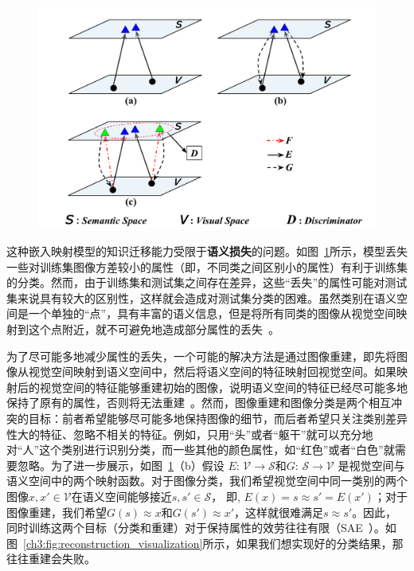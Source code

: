 \begin{figure}
    \centering
        \includegraphics[width=0.95\linewidth]{chapter3/res/zsl_paradigms.pdf}
    \label{ch3:fig:zsl_paradigms}
\end{figure}

这种嵌入映射模型的知识迁移能力受限于\textbf{语义损失}的问题。如图~\ref{ch3:fig:zsl_paradigms}所示，模型丢失一些对训练集图像方差较小的属性（即，不同类之间区别小的属性）有利于训练集的分类。然而，由于训练集和测试集之间存在差异，这些“丢失”的属性可能对测试集来说具有较大的区别性，这样就会造成对测试集分类的困难。虽然类别在语义空间是一个单独的“点”，具有丰富的语义信息，但是将所有同类的图像从视觉空间映射到这个点附近，就不可避免地造成部分属性的丢失~\cite{lazaridou2015hubness,fu2015transductive}。


为了尽可能多地减少属性的丢失，一个可能的解决方法是通过图像重建，即先将图像从视觉空间映射到语义空间中，然后将语义空间的特征映射回视觉空间。如果映射后的视觉空间的特征能够重建初始的图像，说明语义空间的特征已经尽可能多地保持了原有的属性，否则将无法重建~\cite{kim2017learning,yi2017dualgan,zhu2017unpaired,he2016dual}。然而，图像重建和图像分类是两个相互冲突的目标：前者希望能够尽可能多地保持图像的细节，而后者希望只关注类别差异性大的特征、忽略不相关的特征。例如，只用“头”或者“躯干”就可以充分地对“人”这个类别进行识别分类，而一些其他的颜色属性，如“红色”或者“白色”就需要忽略。为了进一步展示，如图~\ref{ch3:fig:zsl_paradigms}（b）假设 $E$: $\mathcal{V}\rightarrow \mathcal{S}$和$G$: $\mathcal{S}\rightarrow \mathcal{V}$ 是视觉空间与语义空间中的两个映射函数。对于图像分类，我们希望视觉空间中同一类别的两个图像$x, x'\in \mathcal{V}$在语义空间能够接近$s, s'\in\mathcal{S}$， 即, $E(x) = s \approx s' = E(x')$；对于图像重建，我们希望$G(s)\approx x$和$G(s')\approx x'$，这样就很难满足$s\approx s'$。因此，同时训练这两个目标（分类和重建）对于保持属性的效劳往往有限（SAE~\cite{kodirov2017semantic}）。如图~\ref{ch3:fig:reconstruction_visualization}所示，如果我们想实现好的分类结果，那往往重建会失败。


